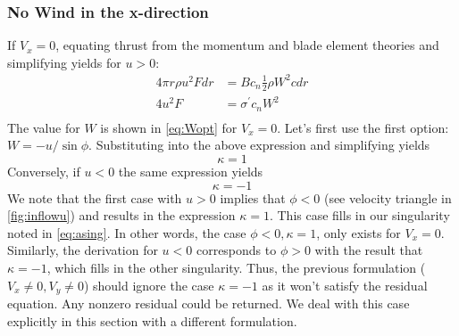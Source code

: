 \subsubsection{No Wind in the x-direction}
If $V_x = 0$, equating thrust from the momentum and blade element theories and simplifying yields for $u > 0$:
\begin{equation}
\begin{aligned}
    4 \pi r \rho u^2 F dr &= B c_n \frac{1}{2} \rho W^2 c dr\\
    4 u^2 F&= \sigma^\prime c_n W^2\\
\end{aligned}
\end{equation}
The value for $W$ is shown in \cref{eq:Wopt} for $V_x = 0$.  Let's first use the first option: $W = -u/\sin\phi$.  Substituting into the above expression and simplifying yields
\begin{equation}
\kappa = 1
\end{equation}
Conversely, if $u < 0$ the same expression yields
\begin{equation}
\kappa = -1
\end{equation}
We note that the first case with $u > 0$ implies that $\phi < 0$ (see velocity  triangle in \cref{fig:inflowu}) and results in the expression $\kappa = 1$.  This case fills in our singularity noted in \cref{eq:asing}.  In other words, the case $\phi < 0, \kappa = 1$, only exists for $V_x = 0$.  Similarly, the derivation for $u < 0$ corresponds to $\phi > 0$ with the result that $\kappa = -1$, which fills in the other singularity.  Thus, the previous formulation ($V_x \ne 0, V_y \ne 0$) should ignore the case $\kappa = -1$ as it won't satisfy the residual equation.  Any nonzero residual could be returned.  We deal with this case explicitly in this section with a different formulation.

